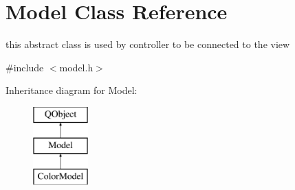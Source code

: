 \hypertarget{class_model}{}\section{Model Class Reference}
\label{class_model}


this abstract class is used by controller to be connected to the view  




{\ttfamily \#include $<$model.\+h$>$}

Inheritance diagram for Model\+:\begin{figure}[H]
\begin{center}
\leavevmode
\includegraphics[height=3.000000cm]{class_model}
\end{center}
\end{figure}
